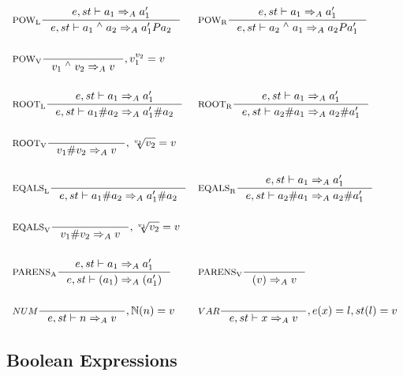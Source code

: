 \begin{align*}
&\inference[$\text{POW}_\text{L}$]{e,st \vdash a_1  \Rightarrow_A a_1'}
                    {e,st \vdash a_1 \; ^\wedge{} \; a_2 \Rightarrow_A a_1' P a_2}
&
&\inference[$\text{POW}_\text{R}$]{e,st \vdash a_1 \Rightarrow_A a_1'}
                    {e,st \vdash a_2 \; ^\wedge{} \; a_1 \Rightarrow_A a_2 P a_1'}
\\\\
&\inference[$\text{POW}_\text{V}$]{}
                    {v_1 \; ^\wedge{} \; v_2 \Rightarrow_A v}
										{, v_1 ^ {v_2} = v}
\\\\
&\inference[$\text{ROOT}_\text{L}$]{e,st \vdash a_1 \Rightarrow_A a_1'}
                    {e,st \vdash a_1 \# a_2 \Rightarrow_A a_1' \# a_2}
&
&\inference[$\text{ROOT}_\text{R}$]{e,st \vdash a_1 \Rightarrow_A a_1'}
                    {e,st \vdash a_2 \# a_1 \Rightarrow_A a_2 \# a_1'}
\\\\
&\inference[$\text{ROOT}_\text{V}$]{}
                    {v_1 \# v_2 \Rightarrow_A v}
										{, \sqrt[v_1]{v_2} = v}
\\\\
&\inference[$\text{EQALS}_\text{L}$]{}
                    {e,st \vdash a_1 \# a_2 \Rightarrow_A a_1' \# a_2}
										{}
&
&\inference[$\text{EQALS}_\text{R}$]{e,st \vdash a_1 \Rightarrow_A a_1'}
                    {e,st \vdash a_2 \# a_1 \Rightarrow_A a_2 \# a_1'}
\\\\
&\inference[$\text{EQALS}_\text{V}$]{}
                    {v_1 \# v_2 \Rightarrow_A v}
										{, \sqrt[v_1]{v_2} = v}
\\\\
&\inference[$\text{PARENS}_\text{A}$]{e,st \vdash a_1 \Rightarrow_A a_1'}
                       {e,st \vdash (a_1) \Rightarrow_A (a_1')}
&
&\inference[$\text{PARENS}_\text{V}$]{}
                       {(v) \Rightarrow_A v}
\\\\
&\inference[$NUM$]{}
                  {e,st \vdash n \Rightarrow_A v}
									{, \mathbb{N}(n) = v}
&
&\inference[$VAR$]{}
                  {e,st \vdash x \Rightarrow_A v}
									{,e(x) = l, st(l) = v}
\end{align*}

\subsection{Boolean Expressions}
\newcommand{\Tand}{\mathbin{\text{AND}}}
\newcommand{\Tnot}{\mathbin{\text{NOT}}}
\newcommand{\Tnand}{\mathbin{\text{NAND}}}
\newcommand{\Tor}{\mathbin{\text{OR}}}
\newcommand{\Tnor}{\mathbin{\text{NOR}}}
\newcommand{\Txor}{\mathbin{\text{XOR}}}

